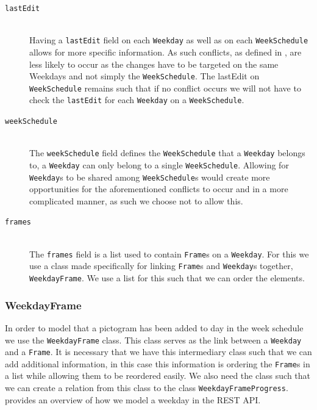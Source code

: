 \begin{description}
    \item [\texttt{lastEdit}] \hfill \\
    Having a \texttt{lastEdit} field on each \texttt{Weekday} as well as on each \texttt{WeekSchedule} allows for more specific information. 
    As such conflicts, as defined in , are less likely to occur as the changes have to be targeted on the same Weekdays and not simply the \texttt{WeekSchedule}. 
    The lastEdit on \texttt{WeekSchedule} remains such that if no conflict occurs we will not have to check the \texttt{lastEdit} for each \texttt{Weekday} on a \texttt{WeekSchedule}.
    \item [\texttt{weekSchedule}] \hfill \\
    The \texttt{weekSchedule} field defines the \texttt{WeekSchedule} that a \texttt{Weekday} belongs to, a \texttt{Weekday} can only belong to a single \texttt{WeekSchedule}.
    Allowing for \texttt{Weekday}s to be shared among \texttt{WeekSchedule}s would create more opportunities for the aforementioned conflicts to occur and in a more complicated manner, as such we choose not to allow this.
    \item [\texttt{frames}] \hfill \\
    The \texttt{frames} field is a list used to contain \texttt{Frame}s on a \texttt{Weekday}.
    For this we use a class made specifically for linking \texttt{Frame}s and \texttt{Weekday}s together, \texttt{WeekdayFrame}.
    We use a list for this such that we can order the elements.
\end{description}

\subsubsection{WeekdayFrame}
In order to model that a pictogram has been added to day in the week schedule we use the \texttt{WeekdayFrame} class.
This class serves as the link between a \texttt{Weekday} and a \texttt{Frame}.
It is necessary that we have this intermediary class such that we can add additional information, in this case this information is ordering the \texttt{Frame}s in a list while allowing them to be reordered easily.
We also need the class such that we can create a relation from this class to the class \texttt{WeekdayFrameProgress}.
 provides an overview of how we model a weekday in the REST API.

